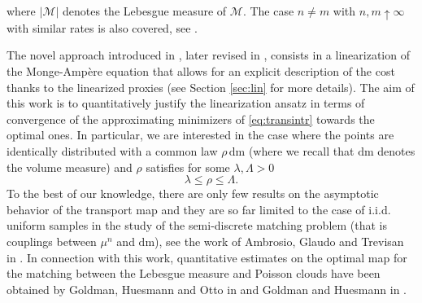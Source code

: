 \documentclass[11pt,a4paper,oneside]{amsart}
\numberwithin{equation}{section}
\newcommand{\dd}{\mathrm{d}}
\newcommand{\m}{\mathrm{m}}
\begin{document}
where $|\mathcal{M}|$ denotes the Lebesgue measure of $\mathcal{M}$. The case $n\neq m$ with $n,m\uparrow\infty$ with similar rates is also covered, see \cite[Theorem 1.2]{ambrosio2021quadratic}. %












\medskip
The novel approach introduced in \cite{caracciolo2014scaling}, later revised in \cite{benedetto2020euclidean}, consists in a linearization of the Monge-Amp\`ere equation that allows for an explicit description of the cost thanks to the linearized proxies (see Section \ref{sec:lin} for more details). The aim of this work is to quantitatively justify the linearization ansatz in terms of convergence of the approximating minimizers of \eqref{eq:transintr} towards the optimal ones. In particular, we are interested in the case where the points are identically distributed with a common law $\rho\,\dd\m$ (where we recall that $\dd\m$ denotes the volume measure) and $\rho$ satisfies for some $\lambda,\Lambda>0$
%
\begin{equation}\label{Ellipticity}
%
\lambda\leq\rho\leq\Lambda.
%
\end{equation}
To the best of our knowledge, there are only few results on the asymptotic behavior of the transport map and they are so far limited to the case of i.i.d. uniform samples in the study of the semi-discrete matching problem (that is couplings between $\mu^n$ and $\dd\m$), see the work of Ambrosio, Glaudo and Trevisan in \cite{ambrosio2019optimal}. In connection with this work, quantitative estimates on the optimal map for the matching between the Lebesgue measure and Poisson clouds have been obtained by Goldman, Huesmann and Otto in \cite{GHO1} and Goldman and Huesmann in \cite{GH}. 
\end{document}
